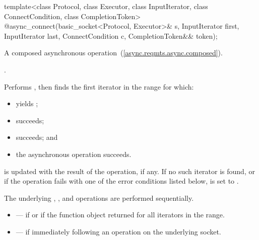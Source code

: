 \begin{itemdecl}
template<class Protocol, class Executor, class InputIterator,
  class ConnectCondition, class CompletionToken>
    @\DEDUCED@ async_connect(basic_socket<Protocol, Executor>& s,
                          InputIterator first, InputIterator last,
                          ConnectCondition c,
                          CompletionToken&& token);
\end{itemdecl}

\begin{itemdescr}
\pnum
A composed asynchronous operation~(\ref{async.reqmts.async.composed}).

\pnum
\completionsig {}.

\pnum
\effects Performs , then finds the first iterator  in the range  for which:
\begin{itemize}
\item
{} yields ;
\item
{} succeeds;
\item
{} succeeds; and
\item
 the asynchronous operation  succeeds.
\end{itemize}
\pnum
{} is updated with the result of the  operation, if any. If no such iterator is found, or if the operation fails with one of the error conditions listed below,  is set to . \begin{note} The underlying , , and  operations are performed sequentially. \end{note}

\pnum
\errors
\begin{itemize}
\item
{} --- if  or if the function object  returned  for all iterators in the range.
\item
{} --- if  immediately following an  operation on the underlying socket.
\end{itemize}
\end{itemdescr}



